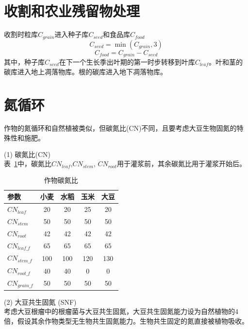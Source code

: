 \section{收割和农业残留物处理}
收割时粒库$C_{grain}$进入种子库$C_{seed}$和食品库$C_{food}$
\begin{equation}
{C}_{ {seed }}=\min \left({C}_{ {grain }}, 3\right)
\end{equation}
\begin{equation}
{C}_{ {food }}={C}_{ {grain }}-{C}_{ {seed }}
\end{equation}
其中，种子库$C_{seed}$在下一个生长季出叶期的第一时步转移到叶库$C_{leaf}$。叶和茎的碳库进入地上凋落物库。根的碳库进入地下凋落物库。


\section{氮循环}
作物的氮循环和自然植被类似，但碳氮比(CN)不同，且要考虑大豆生物固氮的特殊性和施肥。

(1) 碳氮比(CN)\\
表~\ref{tab:作物碳氮比}中，碳氮比$CN_{leaf}$,$ CN_{stem}$, $CN_{root}$用于灌浆前，其余碳氮比用于灌浆开始后。\\
\begin{table}[]
  \centering
  \caption{作物碳氮比}
  \label{tab:作物碳氮比}
\begin{tabular}{@{}lcccc@{}}
\toprule
参数         & 小麦  & 水稻  & 玉米  & 大豆  \\ \midrule
$CN_{leaf}$     & 20  & 20  & 25  & 20  \\
$CN_{stem}$     & 50  & 50  & 50  & 50  \\
$CN_{root}$     & 42  & 42  & 42  & 42  \\
$CN_{leaf\_f}$  & 65  & 65  & 65  & 65  \\
$CN_{stem\_f}$  & 100 & 100 & 120 & 130 \\
$CN_{root\_f}$  & 40  & 40  & 0   & 0   \\
$CN_{grain\_f}$ & 50  & 50  & 50  & 50  \\ \bottomrule
\end{tabular}
\end{table}

(2) 大豆共生固氮 (SNF)\\
考虑大豆根瘤中的根瘤菌与大豆共生固氮，大豆共生固氮能力设为自然植物的4倍，假设其余作物类型无生物共生固氮能力。生物共生固定的氮直接被植物吸收。\\

